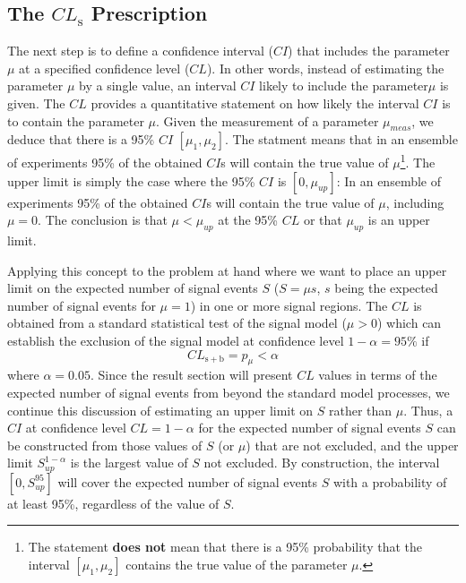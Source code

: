 \subsection{The $CL_\mathrm{s}$ Prescription}
The next step is to define a confidence interval ($CI$) that includes the parameter $\mu$ at a specified confidence level ($CL$). 
In other words, instead of estimating the parameter $\mu$ by a single value, an interval $CI$ likely to include the parameter$\mu$ is given.
The $CL$ provides a quantitative statement on how likely the interval $CI$ is to contain the parameter $\mu$. 
Given the measurement of a parameter $\mu_{meas}$, we deduce that there is
a 95\% $CI$ $[\mu_1,\mu_2]$. The statment means
that in an ensemble of experiments 95\% of the obtained $CI$s will contain 
the true value of $\mu$\footnote{The statement \textbf{does not} mean that
there is a 95\% probability that the interval $[\mu_1,\mu_2]$ contains the 
true value of the parameter $\mu$.}.
The upper limit is simply the case where the 95\% $CI$ is $[0,\mu_{up}]$:
In an ensemble of experiments 95\% of the obtained $CI$s will contain the true value of $\mu$, including $\mu=0$. 
The conclusion is that $\mu < \mu_{up}$ at the 95\% $CL$ or that $ \mu_{up}$ is an upper limit. 

Applying this concept to the problem at hand where we want to place an upper limit on the expected number of 
signal events $S$ ($S=\mu s$, $s$ being the expected number of signal events for $\mu=1$) in one or more signal regions.
The $CL$ is obtained from a standard statistical test of the signal model ($\mu>0$) which can establish the exclusion of the signal 
model at confidence level $1-\alpha = 95 \%$ if 
\begin{equation}
  CL_\mathrm{s+b}  = p_{\mu} < \alpha
\end{equation}
where $\alpha=0.05$. 
Since the result section will present $CL$ values in terms of the expected number of signal events from beyond the standard model 
processes, we continue this discussion of estimating an upper limit on $S$ rather than $\mu$.
Thus, a $CI$ at confidence level $CL=1-\alpha$ for the expected number of signal events $S$ can be constructed from those values of
$S$ (or $\mu$) that are not excluded, and the upper limit $S_{up}^{1-\alpha}$ is the largest value of $S$ not excluded.
By construction, the interval $[0,S_{up}^{95}]$ will cover the expected number of signal events $S$ with a probability of at least 
95\%, regardless of the value of $S$.

